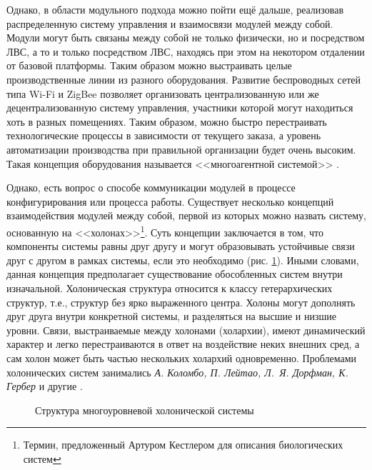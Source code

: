 Однако, в области модульного подхода можно пойти ещё дальше, реализовав распределенную систему управления и взаимосвязи модулей между собой. Модули могут быть связаны между собой не только физически, но и посредством ЛВС, а то и только посредством ЛВС, находясь при этом на некотором отдалении от базовой платформы. Таким образом можно выстраивать целые производственные линии из разного оборудования. Развитие беспроводных сетей типа Wi-Fi и ZigBee позволяет организовать централизованную или же децентрализованную систему управления, участники которой могут находиться хоть в разных помещениях. Таким образом, можно быстро перестраивать технологические процессы в зависимости от текущего заказа, а уровень автоматизации производства при правильной организации будет очень высоким. Такая концепция оборудования называется <<многоагентной системой>> \cite{Parondzhanov}.

Однако, есть вопрос о способе коммуникации модулей в процессе конфигурирования или процесса работы. Существует несколько концепций взаимодействия модулей между собой, первой из которых можно назвать систему, основанную на <<холонах>>\footnote{Термин, предложенный Артуром Кестлером для описания биологических систем}. Суть концепции заключается в том, что компоненты системы равны друг другу и могут образовывать устойчивые связи друг с другом в рамках системы, если это необходимо (рис. \cref{fig:holonic-struc}). Иными словами, данная концепция предполагает существование обособленных систем внутри изначальной. Холоническая структура относится к классу гетерархических структур, т.е., структур без ярко выраженного центра. Холоны могут дополнять друг друга внутри конкретной системы, и разделяться на высшие и низшие уровни. Связи, выстраиваемые между холонами (холархии), имеют динамический характер и легко перестраиваются в ответ на воздействие неких внешних сред, а сам холон может быть частью нескольких холархий одновременно. Проблемами холонических систем занимались \textit{А. Коломбо, П. Лейтао, Л.~Я. Дорфман, К. Гербер} и другие \cite{Ferreira20151099, Zhang6852827, Dewa201414, Wang2014157}.

\begin{figure}[h]
	\caption{Структура многоуровневой холонической системы}\label{fig:holonic-struc}
\end{figure}

